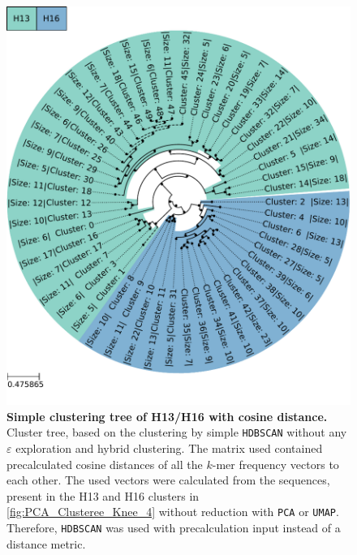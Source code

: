\begin{figure}[!hbt]
    \centering
    \includegraphics[width=\textwidth]{PCA/Clustertree_Segment_4_H_Cosine.pdf}
    \caption[Simple clustering tree of H13/H16 with cosine distance]{\textbf{Simple clustering tree of H13/H16 with cosine distance.} Cluster tree, based on the clustering by simple \texttt{HDBSCAN} without any $\varepsilon$ exploration and hybrid clustering. The matrix used contained precalculated cosine distances of all the $k$-mer frequency vectors to each other. The used vectors were calculated from the sequences, present in the H13 and H16 clusters in \autoref{fig:PCA_Clusteree_Knee_4} without reduction with \texttt{PCA} or \texttt{UMAP}. Therefore, \texttt{HDBSCAN} was used with precalculation input instead of a distance metric.}
    \label{fig:Simple_Clustertree_Cosine}
\end{figure}

